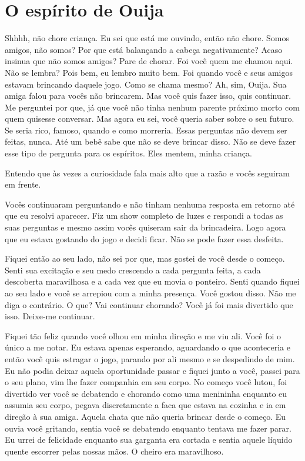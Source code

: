 \documentclass{book}
\begin{document}
\tableofcontents	
\newpage
\chapter{O espírito de Ouija}


\begin{multicols}{2}

 
 Shhhh, não chore criança. Eu sei que está me ouvindo, então não chore. Somos amigos, não somos? Por que está balançando a cabeça negativamente? Acaso insinua que não somos amigos? Pare de chorar. Foi você quem me chamou aqui. Não se lembra? Pois bem, eu lembro muito bem. Foi quando você e seus amigos estavam brincando daquele jogo. Como se chama mesmo? Ah, sim, Ouija. Sua amiga falou para vocês não brincarem. Mas você quis fazer isso, quis continuar. Me perguntei por que, já que você não tinha nenhum parente próximo morto com quem quisesse conversar. Mas agora eu sei, você queria saber sobre o seu futuro. Se seria rico, famoso, quando e como morreria. Essas perguntas não devem ser feitas, nunca. Até um bebê sabe que não se deve brincar disso. Não se deve fazer esse tipo de pergunta para os espíritos. Eles mentem, minha criança.
 
 Entendo que às vezes a curiosidade fala mais alto que a razão e vocês seguiram em frente.
 
 Vocês continuaram perguntando e não tinham nenhuma resposta em retorno até que eu resolvi aparecer. Fiz um show completo de luzes e respondi a todas as suas perguntas e mesmo assim vocês quiseram sair da brincadeira. Logo agora que eu estava gostando do jogo e decidi ficar. Não se pode fazer essa desfeita.
 
 Fiquei então ao seu lado, não sei por que, mas gostei de você desde o começo. Senti sua excitação e seu medo crescendo a cada pergunta feita, a cada descoberta maravilhosa e a cada vez que eu movia o ponteiro. Senti quando fiquei ao seu lado e você se arrepiou com a minha presença. Você gostou disso. Não me diga o contrário. O que? Vai continuar chorando? Você já foi mais divertido que isso. Deixe-me continuar.
 
 Fiquei tão feliz quando você olhou em minha direção e me viu ali. Você foi o único a me notar. Eu estava apenas esperando, aguardando o que aconteceria e então você quis estragar o jogo, parando por ali mesmo e se despedindo de mim. Eu não podia deixar aquela oportunidade passar e fiquei junto a você, passei para o seu plano, vim lhe fazer companhia em seu corpo. No começo você lutou, foi divertido ver você se debatendo e chorando como uma menininha enquanto eu assumia seu corpo, pegava discretamente a faca que estava na cozinha e ia em direção à sua amiga. Aquela chata que não queria brincar desde o começo. Eu ouvia você gritando, sentia você se debatendo enquanto tentava me fazer parar. Eu urrei de felicidade enquanto sua garganta era cortada e sentia aquele líquido quente escorrer pelas nossas mãos. O cheiro era maravilhoso.
 

\end{multicols}
\end{document}
